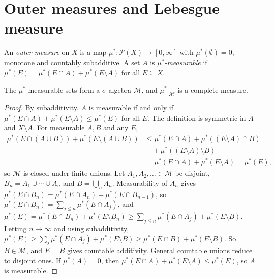 \section{Outer measures and Lebesgue measure}\label{measure-theory:section-lebesgue}

\begin{definition}\label{measure-theory:definition-outer-measure}
An \emph{outer measure} on $X$ is a map $\mu^* \colon \mathcal{P}(X) \to [0, \infty]$ with $\mu^*(\emptyset) = 0$, monotone and countably subadditive. A set $A$ is \emph{$\mu^*$-measurable} if
$\mu^*(E) = \mu^*(E \cap A) + \mu^*(E \setminus A)$ for all $E \subseteq X$.
\end{definition}

\begin{theorem}\label{measure-theory:theorem-caratheodory}
The $\mu^*$-measurable sets form a $\sigma$-algebra $\mathcal{M}$, and $\mu^*|_\mathcal{M}$ is a complete measure.
\end{theorem}

\begin{proof}
By subadditivity, $A$ is measurable if and only if $\mu^*(E \cap A) + \mu^*(E \setminus A) \leq \mu^*(E)$ for all $E$. The definition is symmetric in $A$ and $X \setminus A$. For measurable $A, B$ and any $E$,
\[\begin{aligned}
\mu^*(E \cap (A \cup B)) + \mu^*(E \setminus (A \cup B)) &\leq \mu^*(E \cap A) + \mu^*((E \setminus A) \cap B) \\
&\quad + \mu^*((E \setminus A) \setminus B) \\
&= \mu^*(E \cap A) + \mu^*(E \setminus A) = \mu^*(E),
\end{aligned}\]
so $\mathcal{M}$ is closed under finite unions. Let $A_1, A_2, \ldots \in \mathcal{M}$ be disjoint, $B_n = A_1 \cup \cdots \cup A_n$ and $B = \bigcup_nA_n$. Measurability of $A_n$ gives
$\mu^*(E \cap B_n) = \mu^*(E \cap A_n) + \mu^*(E \cap B_{n-1})$, so $\mu^*(E \cap B_n) = \sum_{j \leq n}\mu^*(E \cap A_j)$, and
$\mu^*(E) = \mu^*(E \cap B_n) + \mu^*(E \setminus B_n) \geq \sum_{j \leq n}\mu^*(E \cap A_j) + \mu^*(E \setminus B)$. Letting $n \to \infty$ and using subadditivity,
$\mu^*(E) \geq \sum_j\mu^*(E \cap A_j) + \mu^*(E \setminus B) \geq \mu^*(E \cap B) + \mu^*(E \setminus B)$. So $B \in \mathcal{M}$, and $E = B$ gives countable additivity. General countable unions reduce
to disjoint ones. If $\mu^*(A) = 0$, then $\mu^*(E \cap A) + \mu^*(E \setminus A) \leq \mu^*(E)$, so $A$ is measurable.
\end{proof}

